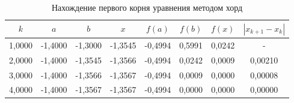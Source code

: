 \begin{table}[]
    \centering
    \begin{tabular}{|c|c|c|c|c|c|c|c|}\hline
$k$	     &	$a$	     &	$b$	     &	$x$	     &	$f(a)$	 &	$f(b)$	 &	$f(x)$	 &	$|x_{k+1} - x_k|$\\\hline
1,0000	 &	-1,4000	 &	-1,3000	 &	-1,3545	 &	-0,4994	 &	0,5991	 &	0,0242	 &	-    \\\hline
2,0000	 &	-1,4000	 &	-1,3545	 &	-1,3566	 &	-0,4994	 &	0,0242	 &	0,0009	 &	0,00210	\\\hline
3,0000	 &	-1,4000	 &	-1,3566	 &	-1,3567	 &	-0,4994	 &	0,0009	 &	0,0000	 &	0,00008	\\\hline
4,0000	 &	-1,4000	 &	-1,3567	 &	-1,3567	 &	-0,4994	 &	0,0000	 &	0,0000	 &	0,00000	\\\hline
    \end{tabular}
    \caption{Нахождение первого корня уравнения методом хорд}
    \label{tab:first-root}
\end{table}